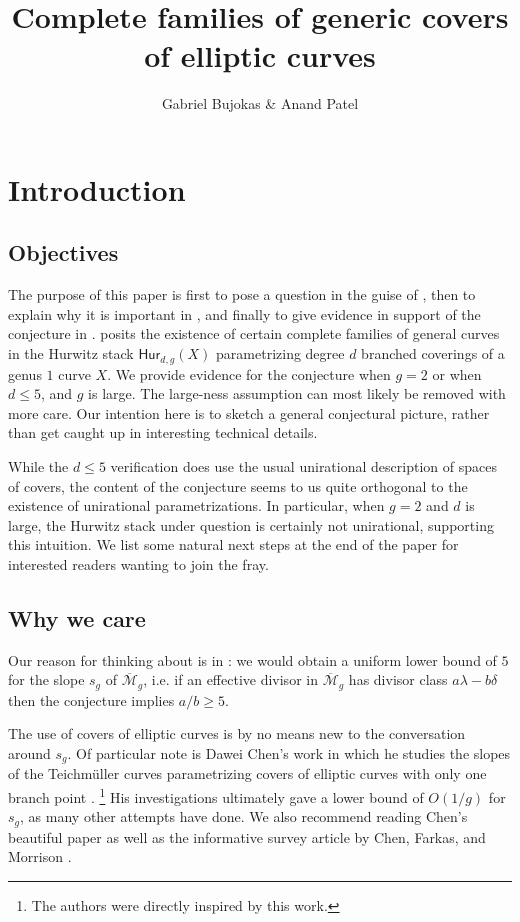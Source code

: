 \documentclass[reqno, 11pt]{amsart}
\author{Gabriel Bujokas \& Anand Patel}
\title{Complete families of generic covers of elliptic curves}
\newcommand{\HdgX}{\mathsf{Hur}_{d,g}(X)}
\newcommand{\Mgbar}{\overline{\mathcal{M}}_{g}}
\begin{document}
\maketitle

\section{Introduction} 

\subsection{Objectives} The purpose of this paper is first to pose a question in the guise of  , then to explain why it is important in , and finally to give evidence in support of the conjecture in .  posits the existence of certain complete families of general curves in the Hurwitz stack $\HdgX$ parametrizing degree $d$ branched coverings of a genus $1$ curve $X$.  We provide evidence for the conjecture when $g=2$ or when $d \leq 5$, and $g$ is large. The large-ness assumption can most likely be removed with more care.  Our intention here is to sketch a general conjectural picture, rather than get caught up in interesting technical details.  

While the $d \leq 5$ verification does use the usual unirational description of spaces of covers, the content of the conjecture seems to us quite orthogonal to the existence of unirational parametrizations.  In particular, when $g=2$ and $d$ is large, the Hurwitz stack under question is certainly not unirational, supporting this intuition.  We list some natural next steps at the end of the paper for interested readers wanting to join the fray.  





\subsection{Why we care}
Our reason for thinking about    is in : we would obtain a uniform lower bound of $5$ for the slope $s_g$ of $\Mgbar$, i.e. if an effective divisor in $\Mgbar$ has divisor class $a \lambda - b \delta$ then the conjecture implies $a/b \geq 5$.  

The use of covers of elliptic curves is by no means new to the conversation around  $s_g$.  Of particular note is Dawei Chen's work in which he studies the slopes of the Teichm\"uller curves parametrizing covers of elliptic curves with only one branch point \cite{chen2011square}.  \footnote{The authors were directly inspired by this work.}  His investigations ultimately gave a lower bound of $O(1/g)$ for $s_g$, as many other attempts have done. We also recommend reading Chen's  beautiful paper \cite{chen2010covers} as well as the informative survey article by Chen, Farkas, and Morrison \cite{chen2012effective}. 
\end{document}
